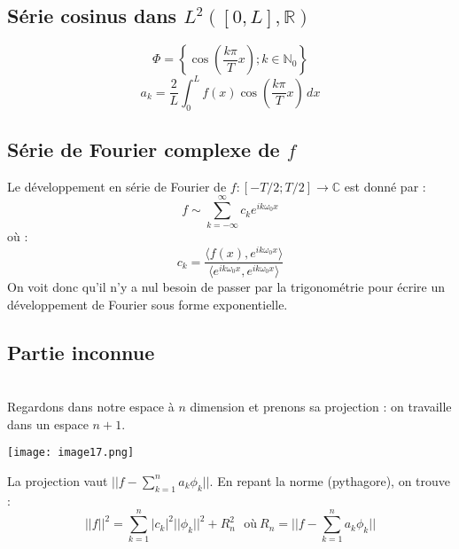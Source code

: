 \documentclass[british,french,11pt, a4paper, openany]{book}
\begin{document}
		\subsection{Série cosinus dans $L^2([0, L], \mathbb{R})$} 
		\begin{equation}
			\Phi = \left\{\cos\left(\frac{k\pi}{T}x\right) ; k \in \mathbb{N}_0\right\}
		\end{equation}
		\begin{equation}
			a_k=\frac{2}{L}\int_0^Lf(x)\cos\left(\frac{k\pi}{T}x\right)\,dx
		\end{equation}
									
		\subsection{Série de Fourier complexe de $f$}
		Le développement en série de Fourier de $f :[-T/2; T/2] \rightarrow \mathbb{C}$ est donné par :
		\begin{equation}
			f \sim \sum_{k=-\infty}^\infty c_ke^{ik\omega_0x}
		\end{equation}
		où :
		\begin{equation}
			c_k = \dfrac{\langle f(x), e^{ik\omega_0x}\rangle}{\langle e^{ik\omega_0x}, e^{ik\omega_0x} \rangle}
		\end{equation}
		On voit donc qu'il n'y a nul besoin de passer par la trigonométrie pour écrire un développement de Fourier sous forme exponentielle.
									
		\subsection{Partie inconnue}
		\ \\
		Regardons dans notre espace à $n$ dimension et prenons sa projection : on travaille dans un espace $n+1$.
		\begin{center}
			\texttt{[image: image17.png]}
		\end{center}
		La projection vaut $||f - \sum_{k=1}^n a_k\phi_k||$. En repant la norme (pythagore), on trouve :
		\begin{equation}
			||f||^2 = \sum_{k=1}^n |c_k|^2||\phi_k||^2 + R_n^2\ \ \ \text{où}\ R_n = ||f - \sum_{k=1}^n a_k\phi_k||
		\end{equation}
									
\end{document}
